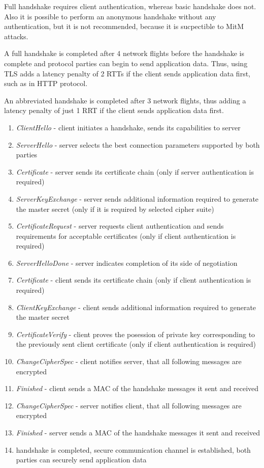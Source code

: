 Full handshake requires client authentication, whereas basic handshake does not. Also it is possible to perform an anonymous handshake without any authentication, but it is not recommended, because it is sucpectible to MitM attacks.

A full handshake is completed after 4 network flights before the handshake is complete and protocol parties can begin to send application data. Thus, using TLS adds a latency penalty of 2 RTTs if the client sends application data first, such as in HTTP protocol.

An abbreviated handshake is completed after 3 network flights, thus adding a latency penalty of just 1 RRT if the client sends application data first.



\begin{enumerate}
  \item \textit{ClientHello} - client initiates a handshake, sends its capabilities to server
  \item \textit{ServerHello} - server selects the best connection parameters supported by both parties
  \item \textit{Certificate} - server sends its certificate chain (only if server authentication is required)
  \item \textit{ServerKeyExchange} - server sends additional information required to generate the master secret (only if it is required by selected cipher suite)
  \item \textit{CertificateRequest} - server requests client authentication and sends requirements for acceptable certificates (only if client authentication is required)
  \item \textit{ServerHelloDone} - server indicates completion of its side of negotiation
  \item \textit{Certificate} - client sends its certificate chain (only if client authentication is required)
  \item \textit{ClientKeyExchange} - client sends additional information required to generate the master secret
  \item \textit{CertificateVerify} - client proves the posession of private key corresponding to the previously sent client certificate (only if client authentication is required)
  \item \textit{ChangeCipherSpec} - client notifies server, that all following messages are encrypted
  \item \textit{Finished} - client sends a MAC of the handshake messages it sent and received
  \item \textit{ChangeCipherSpec} - server notifies client, that all following messages are encrypted
  \item \textit{Finished} - server sends a MAC of the handshake messages it sent and received
  \item handshake is completed, secure communication channel is established, both parties can securely send application data
\end{enumerate}

